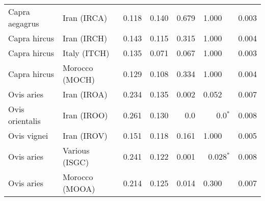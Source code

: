 \begin{center}
\begin{adjustbox}{width = 1\textwidth}
\begin{tabular}{|l|l|r|r|r|r|r|}
      Capra aegagrus &                     Iran (IRCA) &                                              0.118 &                                              0.140 &                0.679 &                                  1.000~~ &              0.003 \\
        Capra hircus &                     Iran (IRCH) &                                              0.143 &                                              0.115 &                0.315 &                                  1.000~~ &              0.004 \\
        Capra hircus &                    Italy (ITCH) &                                              0.135 &                                              0.071 &                0.067 &                                  1.000~~ &              0.003 \\
        Capra hircus &                  Morocco (MOCH) &                                              0.129 &                                              0.108 &                0.334 &                                  1.000~~ &              0.004 \\
          Ovis aries &                     Iran (IROA) &                                              0.234 &                                              0.135 &                0.002 &                                  0.052~~ &              0.007 \\
     Ovis orientalis &                     Iran (IROO) &                                              0.261 &                                              0.130 &                  0.0 &                             0.0$\bm{^*}$ &              0.008 \\
         Ovis vignei &                     Iran (IROV) &                                              0.151 &                                              0.118 &                0.161 &                                  1.000~~ &              0.005 \\
          Ovis aries &                  Various (ISGC) &                                              0.241 &                                              0.122 &                0.001 &                           0.028$\bm{^*}$ &              0.008 \\
          Ovis aries &                  Morocco (MOOA) &                                              0.214 &                                              0.125 &                0.014 &                                  0.300~~ &              0.007 \\

\end{tabular}
\end{adjustbox}
\end{center}

